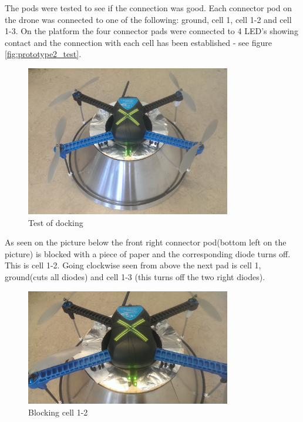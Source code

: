 The pods were tested to see if the connection was good. Each connector pod on the drone was connected to one of the following: ground, cell 1, cell 1-2 and cell 1-3. On the platform the four connector pads were connected to 4 LED's showing contact and the connection with each cell has been established - see figure \vref{fig:prototype2_test}.

\begin{figure}
	\centering
	\includegraphics[width=0.8\textwidth]{imgs/prototype2_test}
	\caption{Test of docking}
	\label{fig:prototype2_test}
\end{figure}

As seen on the picture below the front right connector pod(bottom left on the picture) is blocked with a piece of paper and the corresponding diode turns off. This is cell 1-2. Going clockwise seen from above the next pad is cell 1, ground(cuts all diodes) and cell 1-3 (this turns off the two right diodes).

\begin{figure}
	\centering
	\includegraphics[width=0.8\textwidth]{imgs/cone_blocking_cell_1-2}
	\caption{Blocking cell 1-2}
	\label{fig:cone_docking_test}
\end{figure}

